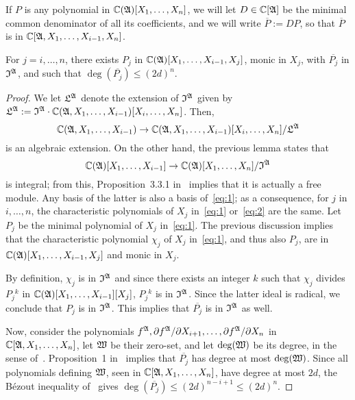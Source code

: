 \documentclass[sigconf]{acmart}
\def\pjb{\overline{P_{j}}}
\def\C{\mathbb{C}}
\def\pa{\partial}
\def\I{\frak{I}}
\def\A{\frak{A}}
\begin{document}
\noindent
If $P$ is any polynomial in $\C(\frak A)[X_1,\dots,X_n]$, we will let
$D \in \C[\frak A]$ be the minimal common denominator of all its
coefficients, and we will write $\overline P := D P$, so that
$\overline P$ is in $\C[\A,X_1,\dots,X_{i-1},X_n]$.


\begin{lemma} 
  For $j=i,\dots,n$, there exists $P_j$ in $
  \C(\A)[X_1,\dots,X_{i-1},X_j]$, monic in $X_j$, with $\pjb$ in
  $\I^\A$, and such that $\deg(\pjb)\leq (2d)^{n}.$
\end{lemma} 
\begin{proof}
  We let $\frak L^\A$ denote the extension of $\I^\A$ given by $\frak
  L^\A:=\I^\A\cdot \C(\frak A, X_1,\dots,X_{i-1})[X_i,\dots,X_n]$. Then,
  \begin{equation}\label{eq:1}
    \C(\frak A, X_1,\dots,X_{i-1}) \to \C(\frak A,
    X_1,\dots,X_{i-1})[X_i,\dots,X_n]/\frak L^\A
  \end{equation}
  is an algebraic extension. On the other hand, 
  the previous lemma states that 
  \begin{equation}\label{eq:2}
    \C(\A)[X_1,\dots,X_{i-1}]\rightarrow
    \C(\A)[X_1,\dots,X_n]/\I^{\A}  
  \end{equation}
  is integral; from this, Proposition~3.3.1 in~\cite{GiHeSa93} implies
  that it is actually a free module. Any basis of the latter is also a
  basis of~\eqref{eq:1}; as a consequence, for $j$ in $i,\dots,n$, the
  characteristic polynomials of $X_j$ in~\eqref{eq:1} or~\eqref{eq:2}
  are the same. Let $P_j$ be the minimal polynomial of $X_j$
  in~\eqref{eq:1}. The previous discussion implies that the
  characteristic polynomial $\chi_j$ of $X_j$ in~\eqref{eq:1}, and
  thus also $P_j$, are in $\C(\A)[X_1,\dots,X_{i-1},X_j]$ and monic in
  $X_j$.

  By definition, $\chi_{j}$ is in $\frak I^\A$ and since there exists
  an integer $k$ such that $\chi_j$ divides $P_j{}^k$ in
  $\C(\A)[X_1,\dots,X_{i-1}][X_j]$, $P_j{}^k$ is in $\frak
  I^\A$. Since the latter ideal is radical, we conclude that $P_{j}$
  is in $\frak I^\A$. This implies that $\pjb$ is in $\frak I^\A$ as
  well.

  Now, consider the polynomials $f^\A, {\pa f^\A}/{\pa
    X_{i+1}}, \dots, {\pa f^\A}/{\pa X_n}$ in $\C[\A,X_1,\dots,X_n]$,
  let $\frak W$ be their zero-set, and let $\deg(\frak W)$ be its
  degree, in the sense of~\cite{H}. Proposition~1 in~\cite{CGR}
  implies that $\pjb$ has degree at most $\deg(\frak W)$. Since all
  polynomials defining $\frak W$, seen in $\C[\A,X_1,\dots,X_n]$, have
  degree at most $2d$, the B\'ezout inequality of~\cite{H} gives
  $\deg(\pjb) \le (2d)^{n-i+1} \le (2d)^n$.
\end{proof}
\end{document}
